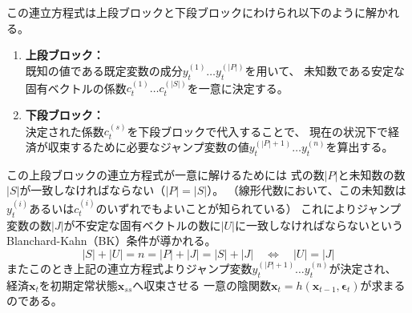 この連立方程式は上段ブロックと下段ブロックにわけられ以下のように解かれる。
\begin{enumerate}
    \item 
    \textbf{上段ブロック：}\\
    既知の値である既定変数の成分\(y_t^{(1)}\dots y_t^{(|P|)}\)を用いて、
    未知数である安定な固有ベクトルの係数\(c_t^{(1)}\dots c_t^{(|S|)}\)を一意に決定する。
    \item
    \textbf{下段ブロック：}\\
    決定された係数\(c_t^{(s)}\)を下段ブロックで代入することで、
    現在の状況下で経済が収束するために必要なジャンプ変数の値\(y_t^{(|P|+1)}\dots y_t^{(n)}\)を算出する。
\end{enumerate}
この上段ブロックの連立方程式が一意に解けるためには
式の数\(|P|\)と未知数の数\(|S|\)が一致しなければならない（\(|P|=|S|\)）。
（線形代数において、この未知数は\(y_t^{(i)}\)あるいは\(c_t^{(i)}\)のいずれでもよいことが知られている）
これによりジャンプ変数の数\(|J|\)が不安定な固有ベクトルの数に\(|U|\)に一致しなければならないという
Blanchard-Kahn（BK）条件が導かれる。
\begin{equation}
\label{form:chapter4_method_bk_condition_formula_complete}
    |S|+|U|=n=|P|+|J|=|S|+|J|\quad\Longleftrightarrow\quad|U|=|J|
\end{equation}
またこのとき上記の連立方程式よりジャンプ変数\(y_t^{(|P|+1)}\dots y_t^{(n)}\)が決定され、
経済\(\mathbf{x}_t\)を初期定常状態\(\mathbf{x}_{ss}\)へ収束させる
一意の陰関数\(\mathbf{x}_t=h(\mathbf{x}_{t-1},\mathbf{\epsilon}_t)\)が求まるのである。